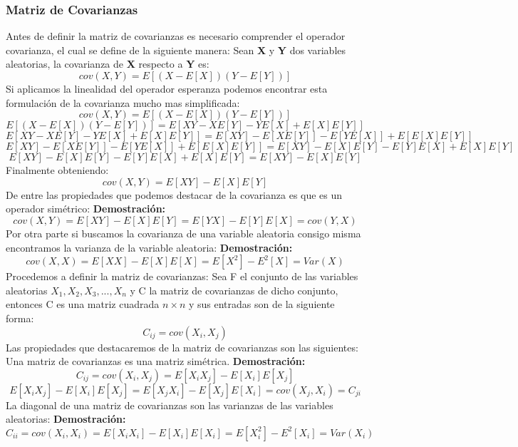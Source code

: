 \documentclass{article}
\begin{document}
\subsubsection{Matriz de Covarianzas}
Antes de definir la matriz de covarianzas es necesario comprender el operador covarianza, el cual se define de la siguiente manera:
Sean \textbf{X} y \textbf{Y} dos variables aleatorias, la covarianza de \textbf{X} respecto a \textbf{Y} es:
\[cov(X,Y)=E[(X-E[X])(Y-E[Y])]\]
Si aplicamos la linealidad del operador esperanza podemos encontrar esta formulación de la covarianza mucho mas simplificada:
\[cov(X,Y)=E[(X-E[X])(Y-E[Y])]\]
\[E[(X-E[X])(Y-E[Y])]=E[XY-XE[Y]-YE[X]+E[X]E[Y]]\]
\[E[XY-XE[Y]-YE[X]+E[X]E[Y]]=E[XY]-E[XE[Y]]-E[YE[X]]+E[E[X]E[Y]]\]
\[E[XY]-E[XE[Y]]-E[YE[X]]+E[E[X]E[Y]]=E[XY]-E[X]E[Y]-E[Y]E[X]+E[X]E[Y]\]
\[E[XY]-E[X]E[Y]-E[Y]E[X]+E[X]E[Y]=E[XY]-E[X]E[Y]\]
Finalmente obteniendo:
\[cov(X,Y)=E[XY]-E[X]E[Y]\]
De entre las propiedades que podemos destacar de la covarianza es que es un operador simétrico:\newline
\textbf{Demostración: \\} 
\[cov(X,Y)=E[XY]-E[X]E[Y]=E[YX]-E[Y]E[X]=cov(Y,X)\]
Por otra parte si buscamos la covarianza de una variable aleatoria consigo misma encontramos la varianza de la variable aleatoria:\newline
\textbf{Demostración: \\}
\[cov(X,X)=E[XX]-E[X]E[X]=E[X^2]-E^2[X]=Var(X)\]
Procedemos a definir la matriz de covarianzas:
Sea F el conjunto de las variables aleatorias $X_1,X_2,X_3,...,X_n$ y C la matriz de covarianzas de dicho conjunto, entonces C es una matriz cuadrada $n\times n$ y sus entradas son de la siguiente forma:
\[C_{ij}=cov(X_i,X_j)\]
Las propiedades que destacaremos de la matriz de covarianzas son las siguientes: 
Una matriz de covarianzas es una matriz simétrica.\newline
\textbf{Demostración: \\}
\[C_{ij}=cov(X_i,X_j)=E[X_iX_j]-E[X_i]E[X_j]\]
\[E[X_iX_j]-E[X_i]E[X_j]=E[X_jX_i]-E[X_j]E[X_i]=cov(X_j,X_i)=C_{ji}\]
La diagonal de una matriz de covarianzas son las varianzas de las variables aleatorias:\newline
\textbf{Demostración: \\}
\[C_{ii}=cov(X_i,X_i)=E[X_iX_i]-E[X_i]E[X_i]=E[X_i^2]-E^2[X_i]=Var(X_i)\]
\end{document}

